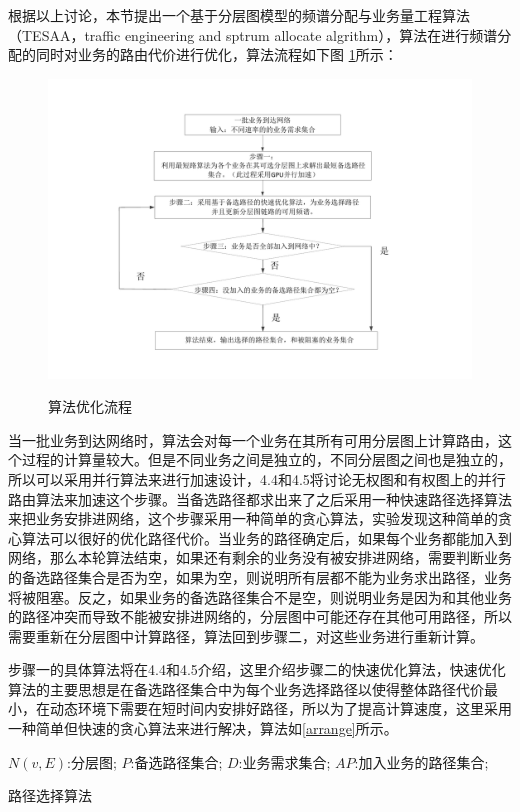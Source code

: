 根据以上讨论，本节提出一个基于分层图模型的频谱分配与业务量工程算法（TESAA，traffic engineering and sptrum allocate algrithm），算法在进行频谱分配的同时对业务的路由代价进行优化，算法流程如下图 \ref{bblayer}所示：
\begin{figure}
\setlength{\belowcaptionskip}{-0.5cm}
\begin{center}
{\includegraphics[width=1 \textwidth]{figures/bbprocess.pdf}}
\end{center}
\caption{{\footnotesize{算法优化流程}}}
\label{bblayer}
\end{figure}

当一批业务到达网络时，算法会对每一个业务在其所有可用分层图上计算路由，这个过程的计算量较大。但是不同业务之间是独立的，不同分层图之间也是独立的，所以可以采用并行算法来进行加速设计，4.4和4.5将讨论无权图和有权图上的并行路由算法来加速这个步骤。当备选路径都求出来了之后采用一种快速路径选择算法来把业务安排进网络，这个步骤采用一种简单的贪心算法，实验发现这种简单的贪心算法可以很好的优化路径代价。当业务的路径确定后，如果每个业务都能加入到网络，那么本轮算法结束，如果还有剩余的业务没有被安排进网络，需要判断业务的备选路径集合是否为空，如果为空，则说明所有层都不能为业务求出路径，业务将被阻塞。反之，如果业务的备选路径集合不是空，则说明业务是因为和其他业务的路径冲突而导致不能被安排进网络的，分层图中可能还存在其他可用路径，所以需要重新在分层图中计算路径，算法回到步骤二，对这些业务进行重新计算。

步骤一的具体算法将在4.4和4.5介绍，这里介绍步骤二的快速优化算法，快速优化算法的主要思想是在备选路径集合中为每个业务选择路径以使得整体路径代价最小，在动态环境下需要在短时间内安排好路径，所以为了提高计算速度，这里采用一种简单但快速的贪心算法来进行解决，算法如\ref{arrange}所示。
\begin{algorithm}[htb]
\begin{algorithmic}[1]
\Require
$N(v,E)$:分层图;
$P$:备选路径集合;
$D$:业务需求集合;
\Ensure
$AP$:加入业务的路径集合;
\EndFor
{}
\EndIf
\EndFor
\EndFor
\end{algorithmic}
\caption{路径选择算法}
\label{arrange}
\end{algorithm}

